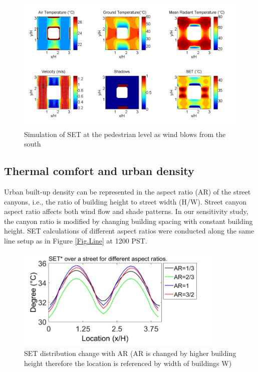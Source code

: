 \documentclass[preprint,3p,12pt,english]{elsarticle}
\begin{document}
\begin{figure}[H]
\graphicspath{ {image/} }
\centerline{\includegraphics[width=14cm]{theta90.png}}    
\caption{Simulation of SET at the pedestrian level as wind blows from the south}  
\label{Fig.Swind}
\end{figure}


\subsection{Thermal comfort and urban density}

Urban built-up density can be represented in the aspect ratio (AR) of the street canyons, i.e., the ratio of building height to street width (H/W). Street canyon aspect ratio affects both wind flow and shade patterns. In our sensitivity study, the canyon ratio is modified by changing building spacing with constant building height. SET calculations of different aspect ratios were conducted along the same line setup as in Figure \ref{Fig.Line} at 1200 PST. 

\begin{figure}[H]
\graphicspath{ {image/} }
\centerline{\includegraphics[width=10cm]{ARchange.png}}
\caption{SET distribution change with AR (AR is changed by higher building height therefore the location is referenced by width of buildings W)}
\label{Fig.AR}
\end{figure}
\end{document}
